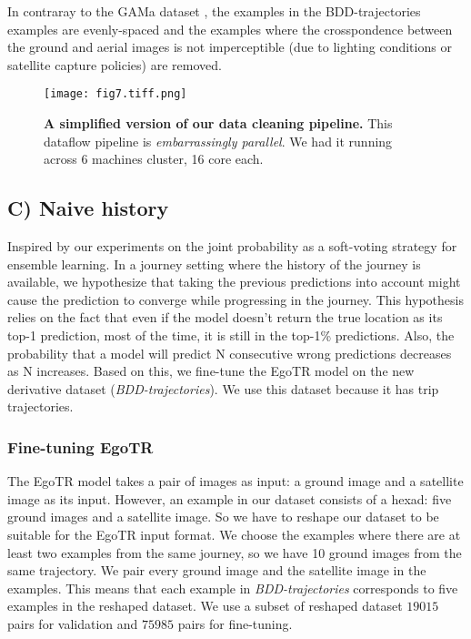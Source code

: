 \documentclass[10pt,letterpaper]{article}
\newif\ifhighlight
\newcommand{\hlb}[1]{\ifhighlight{\hl{#1}}\else{#1}\fi}
\begin{document}
\hlb{In contraray to the GAMa dataset} \cite{bib60}, \hlb{the examples in the BDD-trajectories examples are evenly-spaced and the examples where the crosspondence between the ground and aerial images is not imperceptible (due to lighting conditions or satellite capture policies) are removed.}

\begin{figure}[!ht]
  \caption{{\bf A simplified version of our data cleaning pipeline.} This dataflow pipeline is \emph{embarrassingly parallel}. We had it running across 6 machines cluster, 16 core each.}
  \texttt{[image: fig7.tiff.png]}
  \label{fig7}
\end{figure}

\FloatBarrier

\subsection*{C) Naive history}
Inspired by our experiments on the joint probability as a soft-voting strategy for ensemble learning. In a journey setting where the history of the journey is available, we hypothesize that taking the previous predictions into account might cause the prediction to converge while progressing in the journey. This hypothesis relies on the fact that even if the model doesn't return the true location as its top-1 prediction, most of the time, it is still in the top-1\% predictions. Also, the probability that a model will predict N consecutive wrong predictions decreases as N increases. Based on this, we fine-tune the EgoTR model on the new derivative dataset (\emph{BDD-trajectories}). We use this dataset because it has trip trajectories.

\subsubsection*{Fine-tuning EgoTR}
The EgoTR model takes a pair of images as input: a ground image and a satellite image as its input. However, an example in our dataset consists of a hexad: five ground images and a satellite image. So we have to reshape our dataset to be suitable for the EgoTR input format. We choose the examples where there are at least two examples from the same journey, so we have 10 ground images from the same trajectory. We pair every ground image and the satellite image in the examples. This means that each example in \emph{BDD-trajectories} corresponds to five examples in the reshaped dataset. We use a subset of reshaped dataset $19015$ pairs for validation and $75985$ pairs for fine-tuning.
\end{document}
